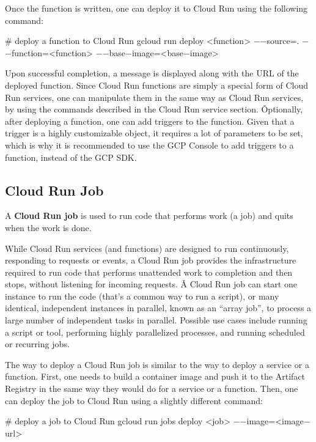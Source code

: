 Once the function is written, one can deploy it to Cloud Run using the following command:
\begin{bash}
# deploy a function to Cloud Run
gcloud run deploy <function> $-$$-$source=. $-$$-$function=<function> $-$$-$base$-$image=<base$-$image>
\end{bash}

Upon successful completion, a message is displayed along with the URL of the deployed function. Since Cloud Run
functions are simply a special form of Cloud Run services, one can manipulate them in the same way as Cloud Run
services, by using the commands described in the Cloud Run service section. \v

Optionally, after deploying a function, one can add triggers to the function. Given that a trigger is a highly
customizable object, it requires a lot of parameters to be set, which is why it is recommended to use the GCP Console
to add triggers to a function, instead of the GCP SDK\@.

\subsection{Cloud Run Job}

A \textbf{Cloud Run job} is used to run code that performs work (a job) and quits when the work is done.
\ed

While Cloud Run services (and functions) are designed to run continuously, responding to requests or events, a Cloud
Run job provides the infrastructure required to run code that performs unattended work to completion and then stops,
without listening for incoming requests. \v

A Cloud Run job can start one instance to run the code (that's a common way to run a script), or many identical,
independent instances in parallel, known as an ``array job'', to process a large number of independent tasks in
parallel. Possible use cases include running a script or tool, performing highly parallelized processes, and running
scheduled or recurring jobs.


The way to deploy a Cloud Run job is similar to the way to deploy a service or a function. First, one needs to build a
container image and push it to the Artifact Registry in the same way they would do for a service or a function. Then,
one can deploy the job to Cloud Run using a slightly different command:
\begin{bash}
# deploy a job to Cloud Run
gcloud run jobs deploy <job> $-$$-$image=<image$-$url>
\end{bash}

